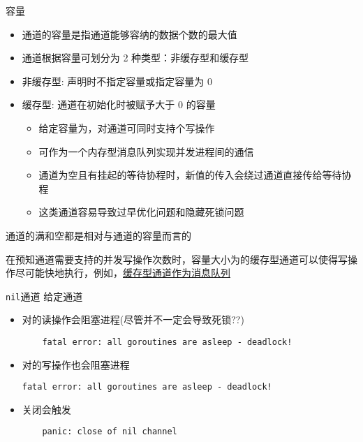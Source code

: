 \begin{frame}{容量}
    \begin{itemize}
        \item 通道的容量是指通道能够容纳的数据个数的最大值
        \item 通道根据容量可划分为 2 种类型：\alert{非缓存型}和\alert{缓存型}
        \item 非缓存型: 声明时不指定容量或指定容量为 0
        \item 缓存型: 通道在初始化时被赋予大于 0 的容量
            \begin{itemize}
                \item 给定容量为，对通道可同时支持个写操作
                \item 可作为一个内存型消息队列实现并发进程间的通信
                \item 通道为空且有挂起的等待协程时，新值的传入会绕过通道直接传给等待协程
                \item 这类通道容易\alert{导致过早优化问题}和\alert{隐藏死锁问题}
            \end{itemize}
    \end{itemize}
    通道的\alert{满}和\alert{空}都是相对与通道的容量而言的 

    \bigskip
    在预知通道需要支持的并发写操作次数时，容量大小为的缓存型通道可以使得写操作尽可能快地执行，例如，\href{https://github.com/sammyne/concurrency-in-go/blob/master/chapter03/channels/buffered_channel.go}{缓存型通道作为消息队列}
\end{frame}

\begin{frame}[fragile]{\texttt{nil}通道}
    给定通道
    \begin{itemize}
        \item 对的读操作会阻塞进程(尽管并不一定会导致死锁??)
\begin{lstlisting}
    fatal error: all goroutines are asleep - deadlock!
\end{lstlisting}
        \item 对的写操作也会阻塞进程
\begin{lstlisting}
fatal error: all goroutines are asleep - deadlock!
\end{lstlisting}
        \item 关闭会触发
\begin{lstlisting}
    panic: close of nil channel 
\end{lstlisting}
    \end{itemize}
\end{frame}


